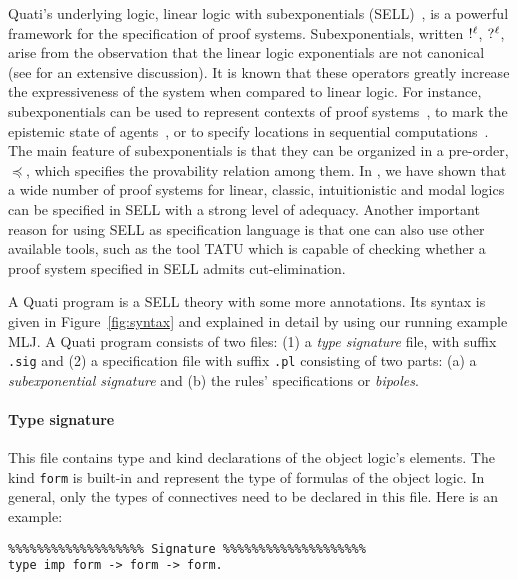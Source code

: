 \documentclass{llncs}
\newcommand{\nbang}[1]{\hbox{$!^{#1}$}}
\newcommand{\nquest}[1]{\hbox{$?^{#1}$}}
\begin{document}
Quati's underlying logic, linear logic with subexponentials
(SELL)~\cite{nigam09ppdp}, is a powerful framework for the specification of proof systems. 
Subexponentials, written $\nbang{\ell}$, $\nquest{\ell}$, arise from the
observation that the linear logic exponentials are not canonical (see
\cite{nigam.jlc} for an extensive discussion). It is known that these operators
greatly increase
the expressiveness of the system when compared to linear logic. For instance,
subexponentials can be used to represent contexts of proof
systems~\cite{nigam.jlc}, to mark the epistemic state of
agents~\cite{nigam12lics}, or to specify locations in sequential
computations~\cite{nigam09ppdp}. 
The main feature of subexponentials is that they can be organized in a pre-order, $\preceq$, which specifies
the provability relation among them. 
In \cite{nigam.jlc}, we have shown that a wide number of proof systems for linear, classic, intuitionistic and 
modal logics can be specified in SELL with a strong level of adequacy. 
%
Another important reason for using SELL as specification language is that one can also use 
other available tools, such as the tool TATU which is capable of checking whether a proof system 
specified in SELL admits cut-elimination.

A Quati program is a SELL theory with some more annotations. Its syntax is given
in Figure~\ref{fig:syntax} and explained in detail  
by using our running example MLJ.
%
A Quati program consists of two files: (1) a \emph{type signature} file, with
suffix \texttt{.sig} and (2) a specification file with suffix \texttt{.pl} consisting of two parts: (a) a
\emph{subexponential signature} and (b) the rules' specifications or
\emph{bipoles}.

\vspace{-2mm}

\paragraph{Type signature}
%
This file contains type and kind declarations of the object
logic's elements. The kind \texttt{form} is built-in and
represent the type of formulas of the object logic. In general, only
the types of connectives need to be declared in this file. Here is an
example:
\vspace{-1mm}

{\small
\begin{verbatim}
%%%%%%%%%%%%%%%%%%% Signature %%%%%%%%%%%%%%%%%%%%
type imp form -> form -> form.
\end{verbatim}
}
\end{document}
